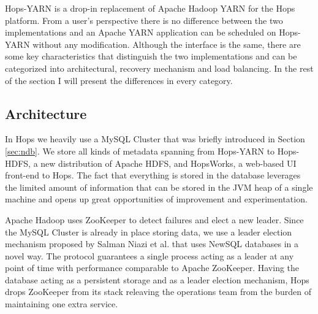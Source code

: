 Hops-YARN is a drop-in replacement of Apache Hadoop YARN for the Hops
\cite{hops} platform. From a user's perspective there is no difference
between the two implementations and an Apache YARN application can be
scheduled on Hops-YARN without any modification. Although the
interface is the same, there are some key characteristics that
distinguish the two implementations and can be categorized into
architectural, recovery mechanism and load balancing. In the rest of
the section I will present the differences in every category.

\subsection{Architecture}
\label{ssec:hopsyarn_arch}
In Hops we heavily use a MySQL Cluster that was briefly introduced in
Section \ref{sec:ndb}. We store all kinds of metadata spanning from
Hops-YARN to Hops-HDFS, a new distribution of Apache HDFS, and
HopsWorks, a web-based UI front-end to Hops. The fact that everything
is stored in the database leverages the limited amount of information
that can be stored in the JVM heap of a single machine and opens up
great opportunities of improvement and experimentation.

Apache Hadoop uses ZooKeeper to detect failures and elect a new leader.
Since the MySQL Cluster is already in place storing data, we use a
leader election mechanism proposed by Salman Niazi et
al. \cite{Niazi2015} that uses NewSQL databases in a novel way.
The protocol guarantees a single process acting
as a leader at any point of time with performance comparable to
Apache ZooKeeper. Having the database acting as a persistent storage
and as a leader election mechanism, Hops drops ZooKeeper from its
stack releaving the operations team from the burden of maintaining
one extra service.

